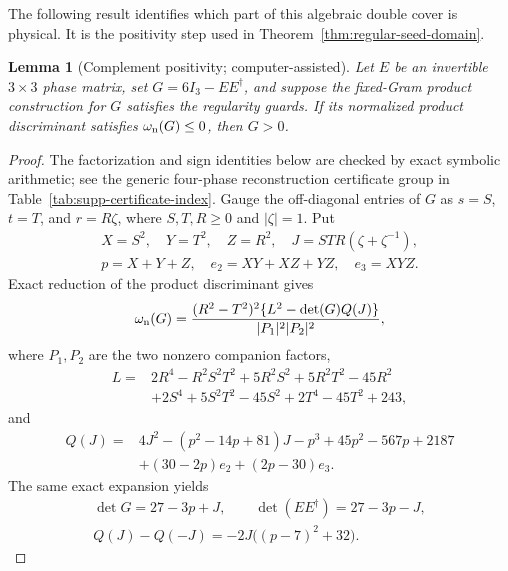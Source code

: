 \documentclass[aps,prx,reprint,nofootinbib,twoside,superscriptaddress,longbibliography,floatfix]{revtex4-2}
\newtheorem{lemma}[theorem]{Lemma}
\theoremstyle{definition}
\begin{document}
The following result identifies which part of this algebraic double cover is physical. It is the positivity step used in Theorem~\ref{thm:regular-seed-domain}.


\begin{lemma}[Complement positivity; computer-assisted]
\label{lem:supp-complement-positivity}
Let $E$ be an invertible $3\times3$ phase matrix, set $G=6I_3-EE^\dagger$, and suppose the fixed-Gram product construction for $G$ satisfies the regularity guards.  If its normalized product discriminant satisfies $\omega_{\rm n}(G)\leq0$, then $G>0$.
\end{lemma}

\begin{proof}
The factorization and sign identities below are checked by exact symbolic arithmetic; see the generic four-phase reconstruction certificate group in Table~\ref{tab:supp-certificate-index}.
Gauge the off-diagonal entries of $G$ as $s=S$, $t=T$, and $r=R\zeta$, where $S,T,R\geq0$ and $|\zeta|=1$.  Put
\begin{equation}
\begin{gathered}
X=S^2,\quad Y=T^2,\quad Z=R^2,\quad
J=STR(\zeta+\zeta^{-1}),\\
p=X+Y+Z,\quad e_2=XY+XZ+YZ,\quad e_3=XYZ.
\end{gathered}
\label{eq:supp-positivity-invariants}
\end{equation}
Exact reduction of the product discriminant gives
\begin{equation}
\omega_{\rm n}(G)=
\frac{(R^2-T^2)^2\{L^2-\det(G)Q(J)\}}
{|P_1|^2|P_2|^2},
\label{eq:supp-positivity-factorization}
\end{equation}
where $P_1,P_2$ are the two nonzero companion factors,
\begin{equation}
\begin{aligned}
L={}&2R^4-R^2S^2T^2+5R^2S^2+5R^2T^2-45R^2\\
&+2S^4+5S^2T^2-45S^2+2T^4-45T^2+243,
\end{aligned}
\label{eq:supp-positivity-L}
\end{equation}
and
\begin{equation}
\begin{aligned}
Q(J)={}&4J^2-(p^2-14p+81)J-p^3+45p^2-567p+2187\\
&+(30-2p)e_2+(2p-30)e_3.
\end{aligned}
\label{eq:supp-positivity-Q}
\end{equation}
The same exact expansion yields
\begin{equation}
\begin{gathered}
\det G=27-3p+J,\qquad
\det(EE^\dagger)=27-3p-J,\\
Q(J)-Q(-J)=-2J\bigl((p-7)^2+32\bigr).
\end{gathered}
\label{eq:supp-positivity-sign-identities}
\end{equation}


\end{proof}
\end{document}
